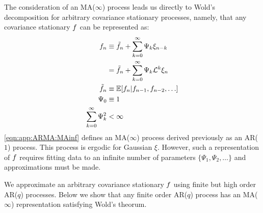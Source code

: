 The consideration of an MA($\infty$) process leads us directly to Wold's decomposition for arbitrary covariance stationary processes, namely, that any covariance stationary $f$ can be represented as:
\begin{align}
f_n & \equiv  \tilde{f}_n + \sum_{k=0}^{\infty} \Psi_k \xi_{n-k}   \\
& =  \tilde{f}_n + \sum_{k=0}^{\infty} \Psi_k \mathcal{L}^k \xi_{n}  \label{eqn:app:ARMA:MAinf}\\
\tilde{f}_n & \equiv \mathbb{E}[f_n | f_{n-1}, f_{n-2}, \hdots] \\
\Psi_0 & \equiv 1 \\
\sum_{k=0}^{\infty} \Psi_k^2 & < \infty
\end{align}
\cref{eqn:app:ARMA:MAinf} defines an MA($\infty$) process derived previously as an AR($1$) process. This process is ergodic for Gaussian $\xi$. However, such a representation of $f$ requires fitting data to an infinite number of parameters $\{\Psi_1, \Psi_2, \hdots \}$  and approximations must be made. 


We approximate an arbitrary covariance stationary $f$ using finite but high order AR($q$) processes. Below we show that any finite order AR($q$) process has an MA($\infty$) representation satisfying Wold's theorum.

